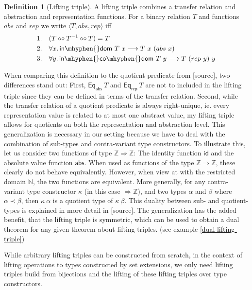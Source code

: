 \documentclass[]{article}
\theoremstyle{definition}
\newtheorem{definition}{Definition}[section]
\newcommand{\relcomp}{\mathbin{\circ\circ}}
\newcommand{\inv}{^{-1}}
\newcommand{\indom}{\mathsf{in\mhyphen{}dom}}
\newcommand{\incodom}{\mathsf{in\mhyphen{}co\mhyphen{}dom}}
\newcommand{\eqrep}{\mathsf{Eq_{rep}}}
\newcommand{\eqabs}{\mathsf{Eq_{abs}}}
\newcommand{\id}{\mathsf{id}}
\newcommand{\nat}{\mathbb{N}}
\newcommand{\inte}{\mathbb{Z}}
\newcommand{\abs}{\mathsf{abs}}
\begin{document}
\begin{definition}[Lifting triple]\label{def-lifting-triple}
	A lifting triple combines a transfer relation and abstraction and representation functions. For a binary relation \(T\) and functions \(abs\) and \(rep\) we write \(\langle T, abs, rep \rangle\) iff
	\begin{align*}
		\text{1.}\quad&(T \relcomp T\inv \relcomp T) = T \\
		\text{2.}\quad&\forall x\ldotp \indom\ T\ x \longrightarrow T\ x\ (abs\ x) \\
		\text{3.}\quad&\forall y\ldotp \incodom\ T\ y \longrightarrow T\ (rep\ y)\ y
	\end{align*}
\end{definition}
When comparing this definition to the quotient predicate from [source], two differences stand out: First, \(\eqabs\ T\) and \(\eqrep\ T\) are not to included in the lifting triple since they can be defined in terms of the transfer relation. Second, while the transfer relation of a quotient predicate is always right-unique, ie. every representation value is related to at most one abstract value, my lifting triple allows for quotients on both the representation and abstraction level. This generalization is necessary in our setting because we have to deal with the combination of sub-types and contra-variant type constructors. To illustrate this, let us consider two functions of type \(\inte \Rightarrow \inte\): The identity function \(\id\) and the absolute value function \(\abs\). When used as functions of the type \(\inte \Rightarrow \inte\), these clearly do not behave equivalently. However, when view at with the restricted domain \(\nat\), the two functions are equivalent. More generally, for any contra-variant type constructor \(\kappa\) (in this case \(\Rightarrow \inte \)), and two types \(\alpha\) and \(\beta\) where \(\alpha \prec \beta\), then \(\kappa\ \alpha\) is a quotient type of \(\kappa\ \beta\). This duality between sub- and quotient-types is explained in more detail in [source]. The generalization has the added benefit, that the lifting triple is symmetric, which can be used to obtain a dual theorem for any given theorem about lifting triples. (see example \ref{dual-lifting-triple})

While arbitrary lifting triples can be constructed from scratch, in the context of lifting operations to types constructed by set extensions, we only need lifting triples build from bijections and the lifting of these lifting triples over type constructors.
\end{document}

